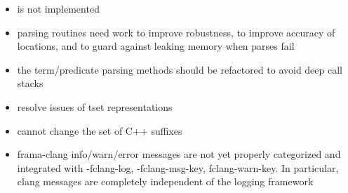 \begin{itemize}
\item {} is not implemented
\item parsing routines need work to improve robustness, to improve accuracy of locations, and to guard against leaking memory when parses fail
\item the term/predicate parsing methods should be refactored to avoid deep call stacks
\item resolve issues of tset representations
\item cannot change the set of C++ suffixes
\item frama-clang info/warn/error messages are not yet properly categorized and integrated with -fclang-log, -fclang-msg-key, fclang-warn-key. In particular, clang messages are completely independent of the \framac logging framework
\end{itemize}




